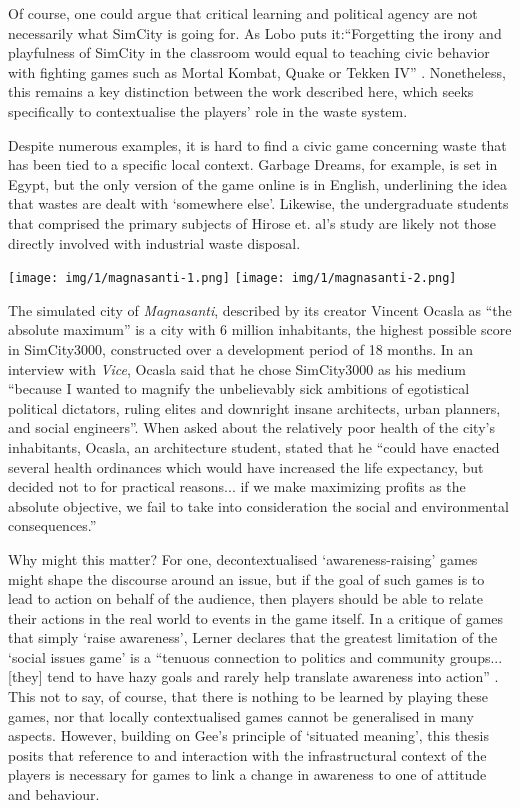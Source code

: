 \documentclass[nofonts,nols,justified,nobib]{tufte-book}
\begin{document}
Of course, one could argue that critical learning and political agency are not necessarily what SimCity is going for. As Lobo puts it:``Forgetting the irony and playfulness of SimCity in the classroom would equal to teaching civic behavior with fighting games such as Mortal Kombat, Quake or Tekken IV'' \cite{lobo_city_2004}. Nonetheless, this remains a key distinction between the work described here, which seeks specifically to contextualise the players' role in the waste system.

Despite numerous examples, it is hard to find a civic game concerning waste that has been tied to a specific local context. Garbage Dreams, for example, is set in Egypt, but the only version of the game online is in English, underlining the idea that wastes are dealt with `somewhere else'. Likewise, the undergraduate students that comprised the primary subjects of Hirose et. al's study are likely not those directly involved with industrial waste disposal. 

\begin{marginfigure}
\texttt{[image: img/1/magnasanti-1.png]}
\texttt{[image: img/1/magnasanti-2.png]}
\caption{The simulated city of \emph{Magnasanti}, described by its creator Vincent Ocasla as ``the absolute maximum'' is a city with 6 million inhabitants, the highest possible score in SimCity3000, constructed over a development period of 18 months. In an interview with \emph{Vice}, Ocasla said that he chose SimCity3000 as his medium ``because I wanted to magnify the unbelievably sick ambitions of egotistical political dictators, ruling elites and downright insane architects, urban planners, and social engineers''. When asked about the relatively poor health of the city's inhabitants, Ocasla, an architecture student, stated that he ``could have enacted several health ordinances which would have increased the life expectancy, but decided not to for practical reasons... if we make maximizing profits as the absolute objective, we fail to take into consideration the social and environmental consequences.''\cite{sterry_totalitarian_2010}}
\end{marginfigure}

Why might this matter? For one, decontextualised `awareness-raising' games might shape the discourse around an issue, but if the goal of such games is to lead to action on behalf of the audience, then players should be able to relate their actions in the real world to events in the game itself. In a critique of games that simply `raise awareness', Lerner declares that the greatest limitation of the `social issues game' is a ``tenuous connection to politics and community groups... [they] tend to have hazy goals and rarely help translate awareness into action'' \cite{lerner_making_2014}. This not to say, of course, that there is nothing to be learned by playing these games, nor that locally contextualised games cannot be generalised in many aspects. However, building on Gee's principle of `situated meaning', this thesis posits that reference to and interaction with the infrastructural context of the players is necessary for games to link a change in awareness to one of attitude and behaviour.
\end{document}
